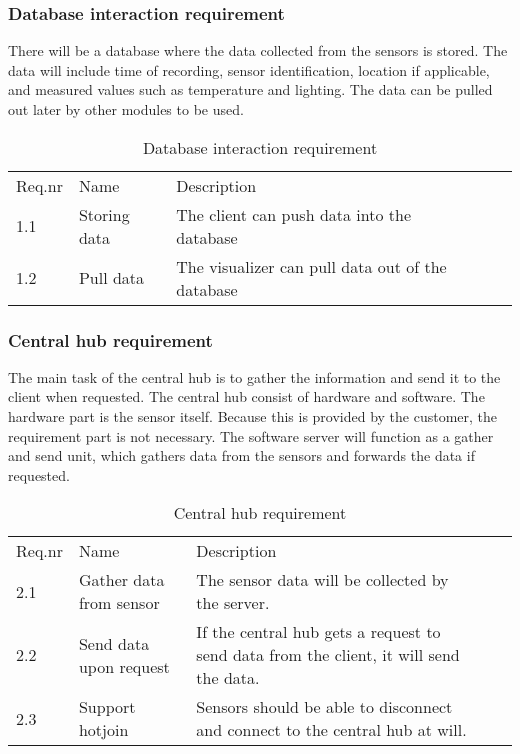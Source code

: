 \documentclass[../document]{subfiles}
\begin{document}
\subsubsection{Database interaction requirement}
There will be a database where the data collected from the sensors is stored. The data will include time of recording, sensor identification, location if applicable, and measured values such as temperature and lighting. The data can be pulled out later by other modules to be used. 

\begin{table}[H]
\caption{Database interaction requirement}
\centering
\begin{tabularx}{\textwidth}{|l|X|X|l|X|}
\hline
\\ \hline Req.nr
&Name
&Description
\\ \hline 1.1
&Storing data
&The client can push data into the database
\\ \hline 1.2
&Pull data
&The visualizer can pull data out of the database
\\ \hline 
\end{tabularx}
\end{table}

\subsubsection{Central hub requirement}
The main task of the central hub is to gather the information and send it to the client when requested. The central hub consist of hardware and software. The hardware part is the sensor itself. Because this is provided by the customer, the requirement part is not necessary. The software server will function as a gather and send unit, which gathers data from the sensors and forwards the data if requested.

\begin{table}[H]
\caption{Central hub requirement}
\centering
\begin{tabularx}{\textwidth}{|l|X|X|l|X|}
\hline
\\ \hline Req.nr
&Name
&Description
\\ \hline 2.1
&Gather data from sensor
&The sensor data will be collected by the server.
\\ \hline 2.2
&Send data upon request
&If the central hub gets a request to send data from the client, it will send the data.
\\ \hline 2.3
&Support hotjoin
&Sensors should be able to disconnect and connect to the central hub at will.
\\ \hline 
\end{tabularx}
\end{table}
\end{document}
